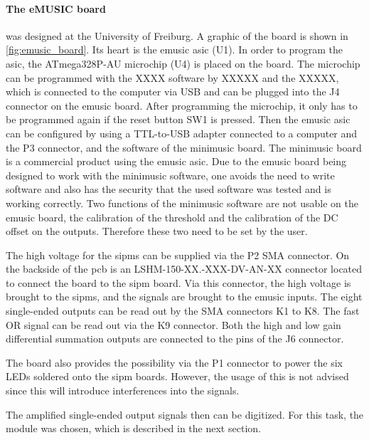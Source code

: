 \paragraph{The eMUSIC board} was designed at the University of Freiburg.
A graphic of the board is shown in \autoref{fig:emusic_board}.
Its heart is the \ac{emusic} \ac{asic} (U1).
In order to program the \ac{asic}, the ATmega328P-AU microchip (U4) is placed on the board.
The microchip can be programmed with the XXXX software by XXXXX and the XXXXX, which is connected to the computer via USB and can be plugged into the J4 connector on the \ac{emusic} board.
After programming the microchip, it only has to be programmed again if the reset button SW1 is pressed.
Then the \ac{emusic} \ac{asic} can be configured by using a TTL-to-USB adapter connected to a computer and the P3 connector, and the software of the minimusic board.
The minimusic board is a commercial product using the \ac{emusic} \ac{asic}.
Due to the \ac{emusic} board being designed to work with the minimusic software, one avoids the need to write software and also has the security that the used software was tested and is working correctly.
Two functions of the minimusic software are not usable on the \ac{emusic} board, the calibration of the threshold and the calibration of the DC offset on the outputs.
Therefore these two need to be set by the user.

The high voltage for the \acp{sipm} can be supplied via the P2 SMA connector.
On the backside of the \ac{pcb} is an LSHM-150-XX.-XXX-DV-AN-XX connector located to connect the board to the \ac{sipm} board.
Via this connector, the high voltage is brought to the \acp{sipm}, and the signals are brought to the \ac{emusic} inputs.
The eight single-ended outputs can be read out by the SMA connectors K1 to K8.
The fast OR signal can be read out via the K9 connector.
Both the high and low gain differential summation outputs are connected to the pins of the J6 connector.

The board also provides the possibility via the P1 connector to power the six LEDs soldered onto the \ac{sipm} boards.
However, the usage of this is not advised since this will introduce interferences into the signals.

The amplified single-ended output signals then can be digitized.
For this task, the  module was chosen, which is described in the next section.

